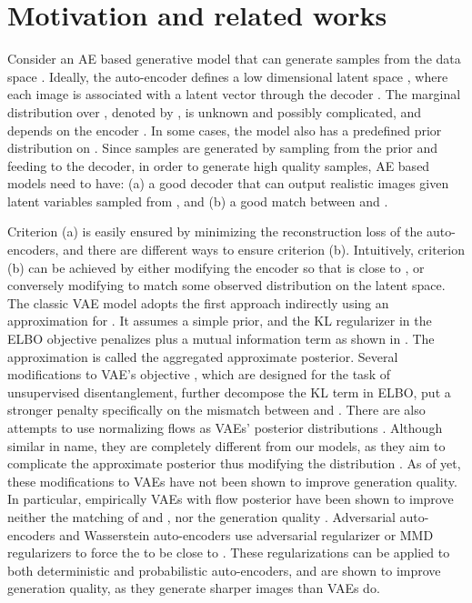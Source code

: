 \documentclass{article}
\begin{document}
\section{Motivation and related works} \label{rw}
Consider an AE based generative model that can generate samples from the data space . Ideally, the auto-encoder defines a low dimensional latent space , where each image  is associated with a latent vector  through the decoder . The marginal distribution over , denoted by , is unknown and possibly complicated, and depends on the encoder . In some cases, the model also has a predefined prior distribution  on . Since samples are generated by sampling  from the prior and feeding  to the decoder,  in order to generate high quality samples, AE based models need to have: (a) a good decoder  that can output realistic images given latent variables sampled from , and (b) a good match between  and . 

Criterion (a) is easily ensured by minimizing the reconstruction loss of the auto-encoders, and there are different ways to ensure criterion (b). Intuitively, criterion (b) can be achieved by either modifying the encoder so that  is close to , or conversely modifying  to match some observed distribution on the latent space. The classic VAE model adopts the first approach indirectly using an approximation  for . It assumes a simple prior, and the KL regularizer in the ELBO objective penalizes  plus a mutual information term as shown in \citep{surgery}. The approximation  is called the aggregated approximate posterior. Several modifications to VAE's objective \citep{surgery,tcvae, factorsing}, which are designed for the task of unsupervised disentanglement, further decompose the KL term in ELBO, put a stronger penalty specifically on the mismatch between  and . There are also attempts to use normalizing flows as VAEs' posterior distributions \citep{impFlow1,impFlow2,impFlow3}. Although similar in name, they are completely different from our models, as they aim to complicate the approximate posterior  thus modifying the distribution . As of yet, these modifications to VAEs have not been shown to improve generation quality. In particular, empirically VAEs with flow posterior have been shown to improve neither the matching of  and  \citep{match}, nor the generation quality \citep{TwoVAE}. Adversarial auto-encoders \citep{AAE} and Wasserstein auto-encoders \citep{wae} use adversarial regularizer or MMD regularizers \citep{MMD} to force the  to be close to . These regularizations can be applied to both deterministic and probabilistic auto-encoders, and are shown to improve generation quality, as they generate sharper images than VAEs do.  
\end{document}
